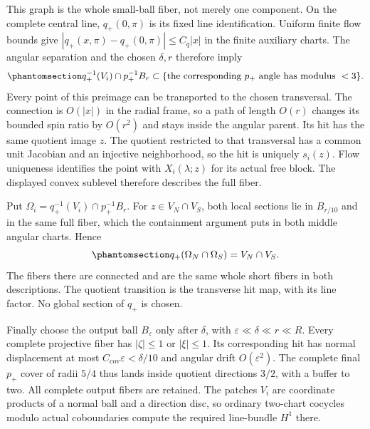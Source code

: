 \documentclass[
  english,
  11pt,
  reqno]{amsart}
\begin{document}
This graph is the whole small-ball fiber, not merely one component. On
the complete central line, \(q_+(0,\pi)\) is its fixed line
identification. Uniform finite flow bounds give
\(|q_+(x,\pi)-q_+(0,\pi)|\le C_q|x|\) in the finite auxiliary charts.
The angular separation and the chosen \(\delta,r\) therefore imply
\begin{equation}\protect\phantomsection\label{eq:gg-penrose-angular-containment}{
 q_+^{-1}(V_i)\cap p_+^{-1}B_r
 \subset\{\text{the corresponding }p_+\text{ angle has modulus }<3\}.
}\end{equation} Every point of this preimage can be transported to the
chosen transversal. The connection is \(O(|x|)\) in the radial frame, so
a path of length \(O(r)\) changes its bounded spin ratio by \(O(r^2)\)
and stays inside the angular parent. Its hit has the same quotient image
\(z\). The quotient restricted to that transversal has a common unit
Jacobian and an injective neighborhood, so the hit is uniquely
\(s_i(z)\). Flow uniqueness identifies the point with \(X_i(\lambda;z)\)
for its actual free block. The displayed convex sublevel therefore
describes the full fiber.

Put \(\Omega_i=q_+^{-1}(V_i)\cap p_+^{-1}B_r\). For
\(z\in V_N\cap V_S\), both local sections lie in \(B_{r/10}\) and in the
same full fiber, which the containment argument puts in both middle
angular charts. Hence
\begin{equation}\protect\phantomsection\label{eq:gg-penrose-actual-overlap-surjectivity}{
 q_+(\Omega_N\cap\Omega_S)=V_N\cap V_S .
}\end{equation} The fibers there are connected and are the same whole
short fibers in both descriptions. The quotient transition is the
transverse hit map, with its line factor. No global section of \(q_+\)
is chosen.

Finally choose the output ball \(B_\varepsilon\) only after \(\delta\),
with \(\varepsilon\ll\delta\ll r\ll R\). Every complete projective fiber
has \(|\zeta|\le1\) or \(|\xi|\le1\). Its corresponding hit has normal
displacement at most \(C_{\mathrm{cov}}\varepsilon<\delta/10\) and
angular drift \(O(\varepsilon^2)\). The complete final \(p_+\) cover of
radii \(5/4\) thus lands inside quotient directions \(3/2\), with a
buffer to two. All complete output fibers are retained. The patches
\(V_i\) are coordinate products of a normal ball and a direction disc,
so ordinary two-chart cocycles modulo actual coboundaries compute the
required line-bundle \(H^1\) there.
\end{document}
